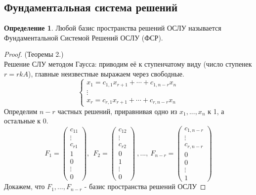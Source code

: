 \documentclass[a4paper, 12pt]{article}
\theoremstyle{definition}
\newtheorem*{definition}{Определение}
\begin{document}
  \subsection{Фундаментальная система решений}
  \begin{definition}
    Любой базис пространства решений ОСЛУ называется \\ Фундаментальной Системой Решений ОСЛУ (ФСР).
  \end{definition} 
  \begin{proof}
    (Теоремы 2.) \\ Решение СЛУ методом Гаусса: приводим её к ступенчатому виду (число ступенек $r=rkA$), главные неизвестные выражаем через свободные. 
    $$\begin{cases}
      x_1=c_{1,1}x_{r+1} + \cdots + c_{1,n-r}x_n \\
      \vdots\\
      x_r=c_{r,1}x_{r+1} + \cdots + c_{r,n-r}x_n
    \end{cases}$$ 
    Определим $n-r$ частных решений, приравнивая одно из $x_1,...,x_n$ к 1, а остальные к 0. 
    $$F_1 = \begin{pmatrix}
      c_{11}\\
      \vdots\\
      c_{r1}\\
      \hline
      1\\
      0\\
      \vdots\\
      0
    \end{pmatrix}, \ \ F_2 = \begin{pmatrix}
      c_{12}\\
      \vdots\\
      c_{r2}\\
      \hline
      0\\
      1\\
      \vdots\\
      0
    \end{pmatrix} \ ,..., \ F_{n-r} = \begin{pmatrix}
      c_{1,{n-r}}\\
      \vdots\\
      c_{r,{n-r}}\\
      \hline
      0\\
      0\\
      \vdots\\
      1
    \end{pmatrix}$$  
    Докажем, что $F_1,...,F_{n-r}$ - базис пространства решений ОСЛУ 

\end{proof}
\end{document}
